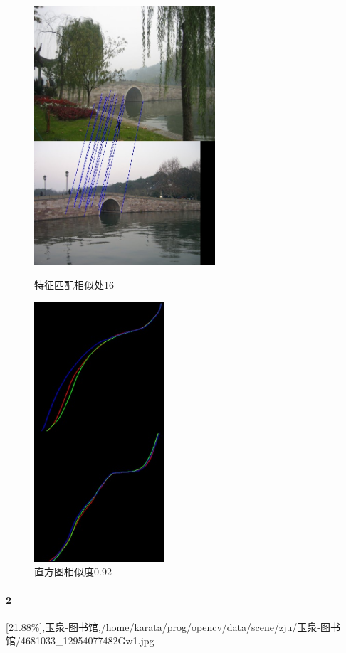 \begin{figure}[htb]
\begin{minipage}[t]{0.5\linewidth}
\centering
\includegraphics[height=3.8in]{西泠.jpg.d/im1sift.jpg}
\caption{特征匹配相似处16}
\label{fig:side:a}
\end{minipage}%
\begin{minipage}[t]{0.5\linewidth}
\centering
\includegraphics[height=3.8in]{西泠.jpg.d/im1hist2.jpg}
\caption{直方图相似度0.92}
\label{fig:side:a}
\end{minipage}%
\end{figure}

\clearpage
\paragraph{2}
[21.88\%],玉泉-图书馆,/home/karata/prog/opencv/data/scene/zju/玉泉-图书馆/4681033_12954077482Gw1.jpg

